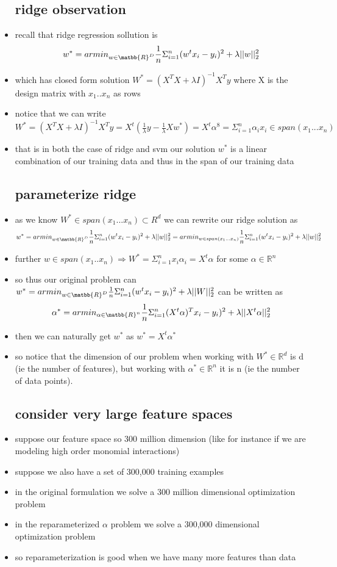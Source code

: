 \documentclass{article}
\begin{document}
\begin{itemize}
\subsection{ridge observation}
\item recall that ridge regression sollution is $$w^{*}=armin_{w\in \matbb{R}^D}\frac{1}{n}\Sigma_{i=1}^{n}(w^{t}x_i-y_i)^2+\lambda||w||_{2}^2$$
\item which has closed form solution $W^{*}=(X^{T}X+\lambda I)^{-1}X^Ty$ where X is the design matrix with $x_1..x_n$ as rows
\item notice that we can write $W^{*}=(X^{T}X+\lambda I)^{-1}X^Ty=X^{t}(\frac{1}{\lambda}y-\frac{1}{\lambda}Xw^{*})=X^{t}\alpha^{8}=\Sigma_{i=1}^{n}\alpha_{i}x_i\in span(x_1...x_n)$
\item that is in both the case of ridge and svm our solution $w^{*}$ is a linear combination of our training data and thus in the span of our training data 
\subsection{parameterize ridge}
\item as we know $W^{*}\in span(x_1...x_n)\subset R^{d}$ we can rewrite our ridge solution as$$w^{*}=armin_{w\in \matbb{R}^D}\frac{1}{n}\Sigma_{i=1}^{n}(w^{t}x_i-y_i)^2+\lambda||w||_{2}^2=armin_{ w\in span(x_1...x_n)}\frac{1}{n}\Sigma_{i=1}^{n}(w^{t}x_i-y_i)^2+\lambda||w||_{2}^2$$ 
\item further $w\in span(x_1..x_n)\Rightarrow W^{*}=\Sigma_{i=1}^{n}x_i\alpha_i=X^{t}\alpha$ for some $\alpha \in \mathbb{R}^{n}$
\item so thus our original problem can $w^{*}=armin_{w\in \matbb{R}^D}\frac{1}{n}\Sigma_{i=1}^{n}(w^{t}x_i-y_i)^2+\lambda ||W||_{2}^{2}$ can be written as $$\alpha^{*}=armin_{\alpha \in \matbb{R}^{n}}\frac{1}{n}\Sigma_{i=1}^{n}(X^{t}\alpha )^{T}x_i-y_i)^2+\lambda ||X^{t}\alpha||_{2}^{2}$$
\item then we can naturally get $w^{*}$ as $w^{*}=X^t\alpha^*$
\item so notice that the dimension of our problem when working with $W^{*}\in \mathbb{R}^{d}$ is d (ie the number of features), but working with $\alpha^{*}\in \mathbb{R}^{n}$ it is n (ie the number of data points).
\subsection{consider very large feature spaces}
\item suppose our feature space so 300 million dimension (like for instance if we are modeling high order monomial interactions)
\item suppose we also have a set of 300,000 training examples
\item in the original formulation we solve a 300 million dimensional optimization problem 
\item in the reparameterized   $\alpha$ problem we solve a 300,000 dimensional optimization problem 
\item  so reparameterization  is good when we have many more features than data 

\end{itemize}
\end{document}
